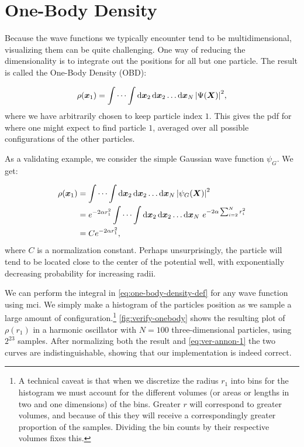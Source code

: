 \documentclass[Thesis.tex]{subfiles}
\begin{document}
\section{One-Body Density}

Because the wave functions we typically encounter tend to be multidimensional,
visualizing them can be quite challenging. One way of reducing the
dimensionality is to integrate out the positions for all but one particle. The
result is called the One-Body Density (OBD):

\begin{align}
  \label{eq:one-body-density-def}
  \rho(\bm{x}_1) = \idotsint \dd{\bm{x}_2}\dd{\bm{x}_2}\dots\dd{\bm{x}_N} \abs{\Psi(\bm{X})}^2,
\end{align}
where we have arbitrarily chosen to keep particle index $1$. This gives the
\gls{pdf} for where one might expect to find particle $1$,
averaged over all possible configurations of the other particles.

As a validating example, we consider the simple Gaussian wave function $\psi_G$.
We get:

\begin{align}
  \rho(\bm{x}_1) &= \idotsint \dd{\bm{x}_2}\dd{\bm{x}_2}\dots\dd{\bm{x}_N} \abs{\psi_G(\bm{X})}^2\\
  &= e^{-2\alpha r_1^2}\idotsint \dd{\bm{x}_2}\dd{\bm{x}_2}\dots\dd{\bm{x}_N} \,e^{-2\alpha\sum_{i=2}^N r_i^2}\\
    &= C e^{-2\alpha r_1^2},\label{eq:ver-annon-1}
\end{align}
where $C$ is a normalization constant. Perhaps unsurprisingly, the particle will
tend to be located close to the center of the potential well, with exponentially
decreasing probability for increasing radii.

We can perform the integral in \cref{eq:one-body-density-def} for any wave
function using \gls{mci}. We simply make a histogram of the
particles position as we sample a large amount of configuration.\footnote{A
technical caveat is that when we discretize the radius $r_1$ into bins for the
histogram we must account for the different volumes (or areas or lengths in two
and one dimensions) of the bins. Greater $r$ will correspond to greater volumes,
and because of this they will receive a correspondingly greater proportion of
the samples. Dividing the bin counts by their respective volumes fixes this.}
\cref{fig:verify-onebody} shows the resulting plot of $\rho(r_1)$ in a harmonic
oscillator with $N=100$ three-dimensional particles, using $2^{23}$
samples. After normalizing both the result and \cref{eq:ver-annon-1} the two
curves are indistinguishable, showing that our implementation is indeed correct.
\end{document}
